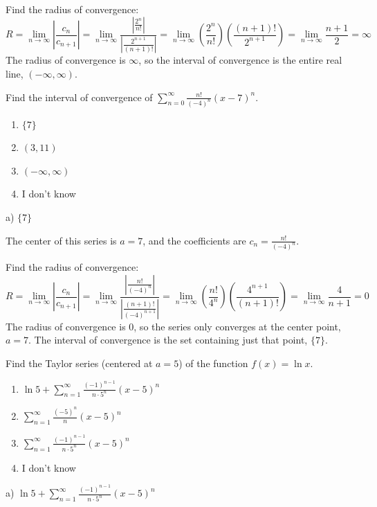 \documentclass[addpoints,12pt,answers]{exam}
\begin{document}
\begin{questions}
\begin{solution}
    Find the radius of convergence:
    $$R=\lim_{n\to\infty}\left|\frac{c_n}{c_{n+1}}\right|=\lim_{n\to\infty}\frac{\left|\frac{2^n}{n!}\right|}{\left|\frac{2^{n+1}}{(n+1)!}\right|}=\lim_{n\to\infty}\left(\frac{2^n}{n!}\right)\left(\frac{(n+1)!}{2^{n+1}}\right)=\lim_{n\to\infty}\frac{n+1}{2}=\infty$$
    The radius of convergence is $\infty$, so the interval of convergence is the entire real line, $(-\infty,\infty)$.
  \end{solution}
  \newpage
  \question
  Find the interval of convergence of $\displaystyle\sum_{n=0}^\infty\frac{n!}{(-4)^n}(x-7)^n$.
  \begin{enumerate}[label=\alph*)]
    \item
    $\{7\}$
    \item
    $(3,11)$
    \item
    $(-\infty,\infty)$
    \item
    I don't know
  \end{enumerate}
  \begin{solution}
    a) $\{7\}$
    
    The center of this series is $a=7$, and the coefficients are $\displaystyle c_n=\frac{n!}{(-4)^n}$.
      
    Find the radius of convergence:
    $$R=\lim_{n\to\infty}\left|\frac{c_n}{c_{n+1}}\right|=\lim_{n\to\infty}\frac{\left|\frac{n!}{(-4)^n}\right|}{\left|\frac{(n+1)!}{(-4)^{n+1}}\right|}=\lim_{n\to\infty}\left(\frac{n!}{4^n}\right)\left(\frac{4^{n+1}}{(n+1)!}\right)=\lim_{n\to\infty}\frac{4}{n+1}=0$$
    The radius of convergence is 0, so the series only converges at the center point, $a=7$. The interval of convergence is the set containing just that point, $\{7\}$.
  \end{solution}
  \newpage
  \question
  Find the Taylor series (centered at $a=5$) of the function $f(x)=\ln x$.
  \begin{enumerate}[label=\alph*)]
    \item
    $\displaystyle\ln 5+\sum_{n=1}^\infty\frac{(-1)^{n-1}}{n\cdot 5^n}(x-5)^n$
    \item
    $\displaystyle\sum_{n=1}^\infty\frac{(-5)^n}{n}(x-5)^n$
    \item
    $\displaystyle\sum_{n=1}^\infty\frac{(-1)^{n-1}}{n\cdot 5^n}(x-5)^n$
    \item
    I don't know
  \end{enumerate}
  \begin{solution}
    a) $\displaystyle\ln 5+\sum_{n=1}^\infty\frac{(-1)^{n-1}}{n\cdot 5^n}(x-5)^n$
    

\end{solution}
\end{questions}
\end{document}
